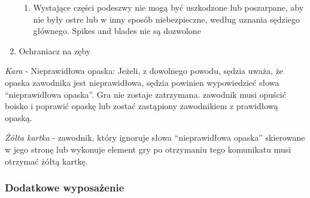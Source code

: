\documentclass[12pt]{article}
\begin{document}
\begin{enumerate}
	      \begin{enumerate}
		      \item
		            Wystające części podeszwy nie mogą być uszkodzone lub poszarpane,
		            aby nie były ostre lub w inny sposób niebezpieczne, według uznania
		            sędziego głównego. Spikes and blades nie są dozwolone
	      \end{enumerate}
	\item
	      Ochraniacz na zęby
\end{enumerate}

\emph{Kara} - Nieprawidłowa opaska: Jeżeli, z dowolnego powodu, sędzia
uważa, że opaska zawodnika jest nieprawidłowa, sędzia powinien
wypowiedzieć słowa ``nieprawidłowa opaska''. Gra nie zostaje zatrzymana.
zawodnik musi opuścić boisko i poprawić opaskę lub zostać zastąpiony
zawodnikiem z prawidłową opaską.

\emph{Żółta kartka} - zawodnik, który ignoruje słowa ``nieprawidłowa
opaska'' skierowane w jego stronę lub wykonuje element gry po otrzymaniu
tego komunikatu musi otrzymać żółtą kartkę.

\subsubsection{Dodatkowe wyposażenie}
\end{document}
